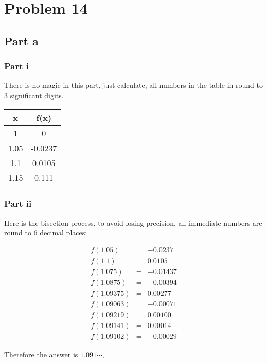 \section*{Problem 14}
\subsection*{Part a}
\subsubsection*{Part i}
There is no magic in this part, just calculate, all numbers in the table in round to 3 significant digits.
\begin{center}
\begin{tabular}{ |c|c| }
    \hline
    x    & f(x)    \\
    \hline
    1    & 0       \\
    1.05 & -0.0237 \\
    1.1  & 0.0105  \\
    1.15 & 0.111   \\
    \hline
\end{tabular}
\end{center}

\subsubsection*{Part ii}
Here is the bisection process, to avoid losing precision, all immediate numbers are round to 6 decimal places:

\begin{eqnarray*}
    f(1.05)   &=& -0.0237  \\
     f(1.1)   &=&  0.0105  \\
     f(1.075) &=& -0.01437 \\
    f(1.0875) &=& -0.00394 \\
   f(1.09375) &=&  0.00277 \\
   f(1.09063) &=& -0.00071 \\
   f(1.09219) &=&  0.00100 \\
   f(1.09141) &=&  0.00014 \\
   f(1.09102) &=& -0.00029
\end{eqnarray*}

Therefore the answer is $ 1.091 \cdots $,

